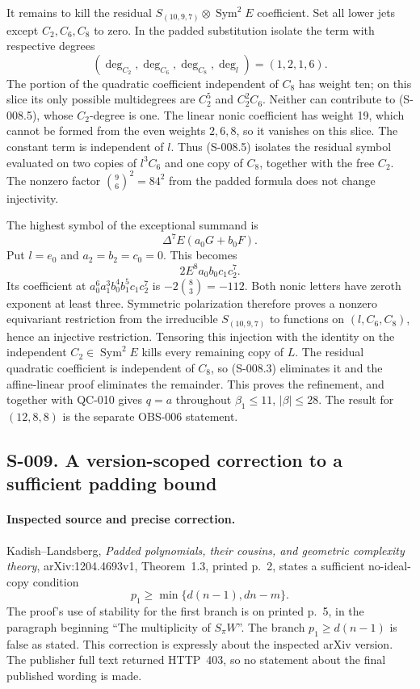 It remains to kill the residual $S_{(10,9,7)}\otimes
\operatorname{Sym}^2E$ coefficient.  Set all lower jets except
$C_2,C_6,C_8$ to zero.  In the padded substitution isolate the
term with respective degrees
\[
                   (\deg_{C_2},\deg_{C_6},\deg_{C_8},\deg_l)
                                      =(1,2,1,6).             \tag{S-008.5}
\]
The portion of the quadratic coefficient independent of $C_8$ has
weight ten; on this slice its only possible multidegrees are
$C_2^5$ and $C_2^2C_6$.  Neither can contribute to (S-008.5),
whose $C_2$-degree is one.  The linear nonic coefficient has weight
19, which cannot be formed from the even weights $2,6,8$, so it
vanishes on this slice.  The constant term is independent of $l$.
Thus (S-008.5) isolates the residual symbol evaluated on two copies
of $l^3C_6$ and one copy of $C_8$, together with the free $C_2$.
The nonzero factor $\binom96^2=84^2$ from the padded formula does
not change injectivity.

The highest symbol of the exceptional summand is
\[
                         \Delta^7E(a_0G+b_0F).
\]
Put $l=e_0$ and $a_2=b_2=c_0=0$.  This becomes
\[
                         2E^8a_0b_0c_1c_2^7.
\]
Its coefficient at
$a_0^6a_1^3b_0^4b_1^5c_1c_2^7$ is
$-2\binom83=-112$.  Both nonic letters have zeroth exponent at
least three.  Symmetric polarization therefore proves a nonzero
equivariant restriction from the irreducible $S_{(10,9,7)}$ to
functions on $(l,C_6,C_8)$, hence an injective restriction.
Tensoring this injection with the identity on the independent
$C_2\in\operatorname{Sym}^2E$ kills every remaining copy of $L$.
The residual quadratic coefficient is independent of $C_8$, so
(S-008.3) eliminates it and the affine-linear proof eliminates
the remainder.  This proves the refinement, and together with
QC-010 gives $q=a$ throughout $\beta_1\leq11$, $|\beta|\leq28$.
The result for $(12,8,8)$ is the separate OBS-006 statement.

\subsection{S-009. A version-scoped correction to a sufficient padding bound}
\paragraph{Inspected source and precise correction.}
Kadish--Landsberg, \emph{Padded polynomials, their cousins, and
geometric complexity theory}, arXiv:1204.4693v1, Theorem~1.3,
printed p.~2, states a sufficient no-ideal-copy condition
\[
                         p_1\geq\min\{d(n-1),dn-m\}.          \tag{S-009.1}
\]
The proof's use of stability for the first branch is on printed
p.~5, in the paragraph beginning ``The multiplicity of $S_\pi W$''.
The branch $p_1\geq d(n-1)$ is false as stated.  This correction
is expressly about the inspected arXiv version.  The publisher
full text returned HTTP~403, so no statement about the final
published wording is made.

